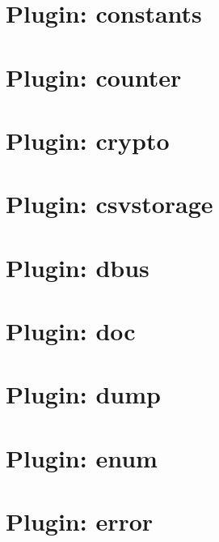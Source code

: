 \documentclass[twoside]{book}
\newcommand{\+}{\discretionary{\mbox{\scriptsize$\hookleftarrow$}}{}{}}
\begin{document}
\chapter{Plugin\+: constants}
\label{md_src_plugins_constants_README}
\hypertarget{md_src_plugins_constants_README}{}

\chapter{Plugin\+: counter}
\label{md_src_plugins_counter_README}
\hypertarget{md_src_plugins_counter_README}{}

\chapter{Plugin\+: crypto}
\label{md_src_plugins_crypto_README}
\hypertarget{md_src_plugins_crypto_README}{}

\chapter{Plugin\+: csvstorage}
\label{md_src_plugins_csvstorage_README}
\hypertarget{md_src_plugins_csvstorage_README}{}

\chapter{Plugin\+: dbus}
\label{md_src_plugins_dbus_README}
\hypertarget{md_src_plugins_dbus_README}{}

\chapter{Plugin\+: doc}
\label{md_src_plugins_doc_README}
\hypertarget{md_src_plugins_doc_README}{}

\chapter{Plugin\+: dump}
\label{md_src_plugins_dump_README}
\hypertarget{md_src_plugins_dump_README}{}

\chapter{Plugin\+: enum}
\label{md_src_plugins_enum_README}
\hypertarget{md_src_plugins_enum_README}{}

\chapter{Plugin\+: error}
\label{md_src_plugins_error_README}
\hypertarget{md_src_plugins_error_README}{}

\end{document}
